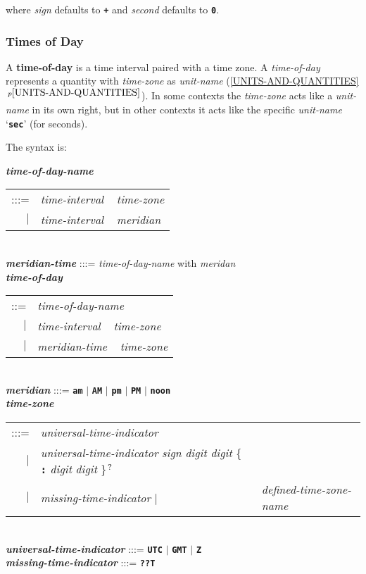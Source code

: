 \documentclass[12pt]{article}
\newcommand{\TT}[1]{{\tt \bfseries #1}}
\newcommand{\key}[1]{{\rm \bfseries #1}}
\newcommand{\ttkey}[1]{{\tt \bfseries #1}}
\newcommand{\emkey}[1]{{\em \bfseries #1}}
\newcommand{\itemref}[1]{\ref{#1}$\,^{p\pageref{#1}}$}
\newcommand{\QMARK}{{$^{\,\mbox{\footnotesize ?}}$}}
\newenvironment{indpar}[1][0.3in]%
	{\begin{list}{}%
		     {\setlength{\itemsep}{0in}%
		      \setlength{\topsep}{0in}%
		      \setlength{\parsep}{1ex}%
		      \setlength{\labelwidth}{#1}%
		      \setlength{\leftmargin}{#1}%
		      \addtolength{\leftmargin}{\labelsep}}%
	 \item}%
	{\end{list}}
\begin{document}
where {\em sign} defaults to \TT{+} and {\em second} defaults to \TT{0}.

\subsubsection{Times of Day}
\label{TIMES-OF-DAY}

A \key{time-of-day} is a time interval paired with a time zone.
A {\em time-of-day} represents a quantity
with {\em time-zone} as {\em unit-name}
(\itemref{UNITS-AND-QUANTITIES}).
In some contexts the {\em time-zone} acts like a {\em unit-name} in
its own right, but in other contexts it acts
like the specific {\em unit-name} `\TT{sec}' (for seconds).

The syntax is:

\begin{indpar}
\emkey{time-of-day-name} \begin{tabular}[t]{rl}
    :::= & {\em time-interval} ~ {\em time-zone} \\
     $|$ & {\em time-interval} ~ {\em meridian} \\
    \end{tabular}
\\[1ex]
\emkey{meridian-time} :::= {\em time-of-day-name} with {\em meridan}
\\[1ex]
\emkey{time-of-day} \begin{tabular}[t]{rl}
     ::= & {\em time-of-day-name} \\
     $|$ & {\em time-interval} ~ {\em time-zone} \\
     $|$ & {\em meridian-time} ~ {\em time-zone} \\
    \end{tabular}
\\[1ex]
\emkey{meridian} :::= \TT{am} $|$ \TT{AM} $|$ \TT{pm} $|$ \TT{PM}
                 $|$ \TT{noon}
\\[1ex]
\emkey{time-zone}
    \begin{tabular}[t]{rl}
    :::= & {\em universal-time-indicator} \\
    $|$ & {\em universal-time-indicator}
          {\em sign} {\em digit} {\em digit}
	   \{ \TT{:} {\em digit} {\em digit} \}\QMARK{} \\
    $|$ & {\em missing-time-indicator}
    $|$ & {\em defined-time-zone-name}
    \end{tabular}
\\[1ex]
\emkey{universal-time-indicator} :::= \ttkey{UTC} $|$ \ttkey{GMT} $|$ \ttkey{Z}
\\[1ex]
\emkey{missing-time-indicator} :::= \ttkey{??T}
\end{indpar}
\end{document}
